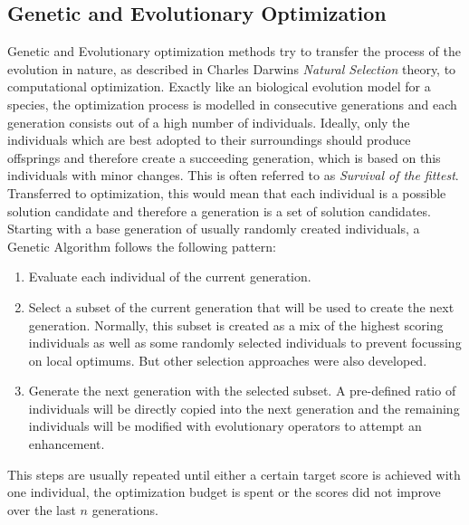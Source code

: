 \subsection{Genetic and Evolutionary Optimization}
\label{sec:theory:optimization:genetic}
Genetic and Evolutionary optimization methods try to transfer the process of the evolution in nature, as described in Charles Darwins \textit{Natural Selection} theory, to computational optimization.
Exactly like an biological evolution model for a species, the optimization process is modelled in consecutive generations and each generation consists out of a high number of individuals.
Ideally, only the individuals which are best adopted to their surroundings should produce offsprings and therefore create a succeeding generation, which is based on this individuals with minor changes.
This is often referred to as \textit{Survival of the fittest}.
Transferred to optimization, this would mean that each individual is a possible solution candidate and therefore a generation is a set of solution candidates.
Starting with a base generation of usually randomly created individuals, a Genetic Algorithm follows the following pattern:
\begin{enumerate}
    \item Evaluate each individual of the current generation.
    \item Select a subset of the current generation that will be used to create the next generation. Normally, this subset is created as a mix of the highest scoring individuals as well as some randomly selected individuals to prevent focussing on local optimums. But other selection approaches were also developed.
    \item Generate the next generation with the selected subset. A pre-defined ratio of individuals will be directly copied into the next generation and the remaining individuals will be modified with evolutionary operators to attempt an enhancement.
\end{enumerate}
This steps are usually repeated until either a certain target score is achieved with one individual, the optimization budget is spent or the scores did not improve over the last $n$ generations.

